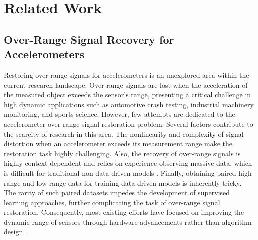 \section{Related Work}
\subsection{Over-Range Signal Recovery for Accelerometers}
Restoring over-range signals for accelerometers is an unexplored area within the current research landscape. Over-range signals are lost when the acceleration of the measured object exceeds the sensor's range, presenting a critical challenge in high dynamic applications such as automotive crash testing, industrial machinery monitoring, and sports science. However, few attempts are dedicated to the accelerometer over-range signal restoration problem.
Several factors contribute to the scarcity of research in this area. The nonlinearity and complexity of signal distortion when an accelerometer exceeds its measurement range make the restoration task highly challenging. Also, the recovery of over-range signals is highly context-dependent and relies on experience observing massive data, which is difficult for traditional non-data-driven models \cite{yang2024visionzip}. Finally, obtaining paired high-range and low-range data for training data-driven models is inherently tricky. The rarity of such paired datasets impedes the development of supervised learning approaches, further complicating the task of over-range signal restoration. Consequently, most existing efforts have focused on improving the dynamic range of sensors through hardware advancements rather than algorithm design \cite{wu2024design}.


